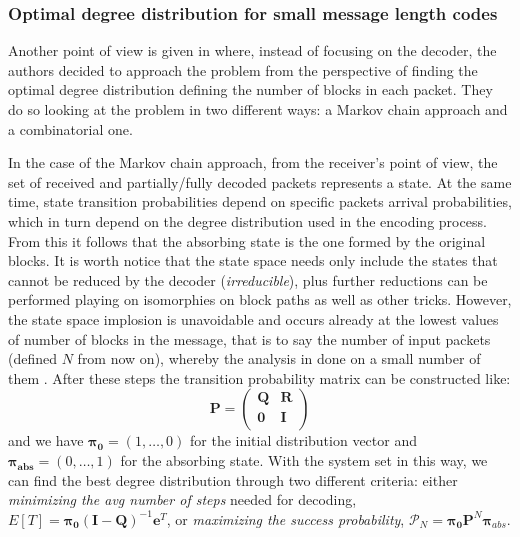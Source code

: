 \subsubsection{Optimal degree distribution for small message length codes}
Another point of view is given in \cite{Hyytia2007} where, instead of focusing on the decoder, the authors decided to approach the problem from the perspective of finding the optimal degree distribution defining the number of blocks in each packet. They do so looking at the problem in two different ways: a Markov chain approach and a combinatorial one.

In the case of the Markov chain approach, from the receiver's point of view, the set of received and partially/fully decoded packets represents a state. At the same time, state transition probabilities depend on specific packets arrival probabilities, which in turn depend on the degree distribution used in the encoding process. From this it follows that the absorbing state is the one formed by the original blocks. It is worth notice that the state space needs only include the states that cannot be reduced by the decoder (\textit{irreducible}), plus further reductions can be performed playing on isomorphies on block paths as well as other tricks. However, the state space implosion is unavoidable and occurs already at the lowest values of number of blocks in the message, that is to say the number of input packets (defined $N$ from now on), whereby the analysis in done on a small number of them \cite{Hyytia2007}. After these steps the transition probability matrix can be constructed like:
\begin{equation}
  \textbf{P} =
  \begin{pmatrix}
    \boldsymbol{Q} & \boldsymbol{R}\\
    \boldsymbol{0} & \boldsymbol{I}\\
  \end{pmatrix}
\end{equation}
and we have $\boldsymbol{\pi_0} = (1,\dots,0)$ for the initial distribution vector and $\boldsymbol{\pi_{abs}} = (0,\dots,1)$ for the absorbing state. With the system set in this way, we can find the best degree distribution through two different criteria: either \textit{minimizing the avg number of steps} needed for decoding, $E[T]=\boldsymbol{\pi_0}(\boldsymbol{I}-\boldsymbol{Q})^{-1}\boldsymbol{e}^T$, or \textit{maximizing the success probability}, $\mathcal{P}_N = \boldsymbol{\pi_0 P}^N\boldsymbol{\pi}_{abs}$.


